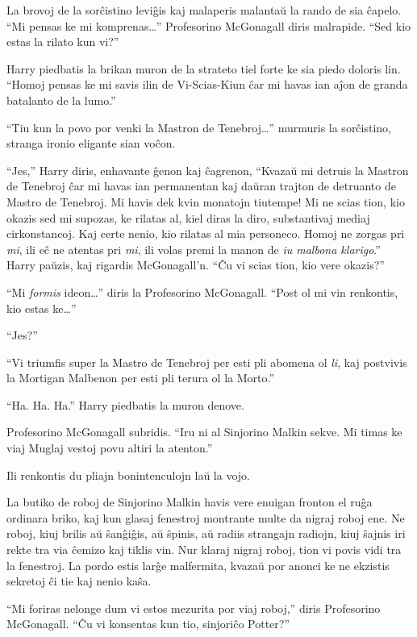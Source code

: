 La brovoj de la sorĉistino leviĝis kaj malaperis malantaŭ la rando
de sia ĉapelo. ``Mi pensas ke mi komprenas\ldots'' Profesorino
McGonagall diris malrapide. ``Sed kio estas la rilato kun vi?''

Harry piedbatis la brikan muron de la strateto tiel forte ke sia piedo
doloris lin. ``Homoj pensas ke mi savis ilin de Vi-Scias-Kiun ĉar mi
havas ian aĵon de granda batalanto de la lumo.''

``Tiu kun la povo por venki la Mastron de Tenebroj\ldots'' murmuris
la sorĉistino, stranga ironio eligante sian voĉon.

``Jes,'' Harry diris, enhavante ĝenon kaj ĉagrenon, ``Kvazaŭ mi detruis
la Mastron de Tenebroj ĉar mi havas ian permanentan kaj daŭran trajton
de detruanto de Mastro de Tenebroj. Mi havis dek kvin monatojn
tiutempe! Mi ne scias tion, kio okazis sed mi supozas, ke rilatas
al, kiel diras la diro, substantivaj mediaj cirkonstancoj. Kaj certe
nenio, kio rilatas al mia personeco. Homoj ne zorgas pri \emph{mi},
ili eĉ ne atentas pri \emph{mi}, ili volas premi la manon de
\emph{iu malbona klarigo}.''  Harry paŭzis, kaj rigardis
McGonagall'n. ``Ĉu vi scias tion, kio vere okazis?''

``Mi \emph{formis} ideon\ldots'' diris la Profesorino
McGonagall. ``Post ol mi vin renkontis, kio estas ke\ldots''

``Jes?''

``Vi triumfis super la Mastro de Tenebroj per esti pli abomena ol
\emph{li}, kaj postvivis la Mortigan Malbenon per esti pli terura ol
la Morto.''

``Ha. Ha. Ha.'' Harry piedbatis la muron denove.

Profesorino McGonagall subridis. ``Iru ni al Sinjorino Malkin
sekve. Mi timas ke viaj Muglaj vestoj povu altiri la atenton.''

Ili renkontis du pliajn bonintenculojn laŭ la vojo.

La butiko de roboj de Sinjorino Malkin havis vere enuigan fronton
el ruĝa ordinara briko, kaj kun glasaj fenestroj montrante multe da
nigraj roboj ene. Ne roboj, kiuj brilis aŭ ŝanĝiĝis, aŭ ŝpinis, aŭ
radiis strangajn radiojn, kiuj ŝajnis iri rekte tra via ĉemizo kaj
tiklis vin. Nur klaraj nigraj roboj, tion vi povis vidi tra la
fenestroj. La pordo estis larĝe malfermita, kvazaŭ por anonci ke ne
ekzistis sekretoj ĉi tie kaj nenio kaŝa.

``Mi foriras nelonge dum vi estos mezurita por viaj roboj,''
diris Profesorino McGonagall. ``Ĉu vi konsentas kun tio, sinjoriĉo
Potter?''

